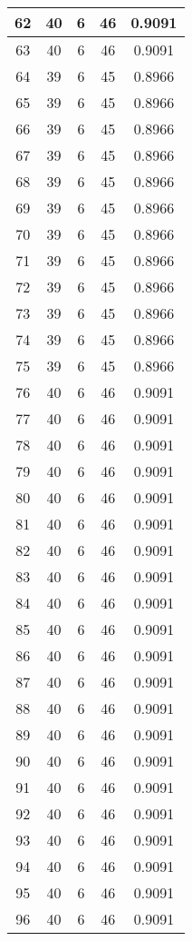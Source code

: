 \documentclass[letterpaper, 12pt]{article}
\begin{document}
\begin{longtable}{|c|c|c|c|c|}
\hline
62 & 40 & 6 & 46 & 0.9091 \\
\hline
63 & 40 & 6 & 46 & 0.9091 \\
\hline
64 & 39 & 6 & 45 & 0.8966 \\
\hline
65 & 39 & 6 & 45 & 0.8966 \\
\hline
66 & 39 & 6 & 45 & 0.8966 \\
\hline
67 & 39 & 6 & 45 & 0.8966 \\
\hline
68 & 39 & 6 & 45 & 0.8966 \\
\hline
69 & 39 & 6 & 45 & 0.8966 \\
\hline
70 & 39 & 6 & 45 & 0.8966 \\
\hline
71 & 39 & 6 & 45 & 0.8966 \\
\hline
72 & 39 & 6 & 45 & 0.8966 \\
\hline
73 & 39 & 6 & 45 & 0.8966 \\
\hline
74 & 39 & 6 & 45 & 0.8966 \\
\hline
75 & 39 & 6 & 45 & 0.8966 \\
\hline
76 & 40 & 6 & 46 & 0.9091 \\
\hline
77 & 40 & 6 & 46 & 0.9091 \\
\hline
78 & 40 & 6 & 46 & 0.9091 \\
\hline
79 & 40 & 6 & 46 & 0.9091 \\
\hline
80 & 40 & 6 & 46 & 0.9091 \\
\hline
81 & 40 & 6 & 46 & 0.9091 \\
\hline
82 & 40 & 6 & 46 & 0.9091 \\
\hline
83 & 40 & 6 & 46 & 0.9091 \\
\hline
84 & 40 & 6 & 46 & 0.9091 \\
\hline
85 & 40 & 6 & 46 & 0.9091 \\
\hline
86 & 40 & 6 & 46 & 0.9091 \\
\hline
87 & 40 & 6 & 46 & 0.9091 \\
\hline
88 & 40 & 6 & 46 & 0.9091 \\
\hline
89 & 40 & 6 & 46 & 0.9091 \\
\hline
90 & 40 & 6 & 46 & 0.9091 \\
\hline
91 & 40 & 6 & 46 & 0.9091 \\
\hline
92 & 40 & 6 & 46 & 0.9091 \\
\hline
93 & 40 & 6 & 46 & 0.9091 \\
\hline
94 & 40 & 6 & 46 & 0.9091 \\
\hline
95 & 40 & 6 & 46 & 0.9091 \\
\hline
96 & 40 & 6 & 46 & 0.9091 \\

\end{longtable}
\end{document}
